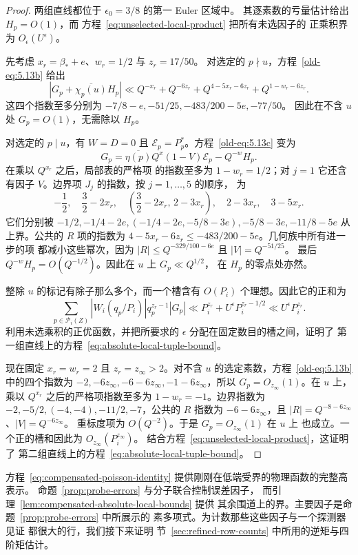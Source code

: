 \begin{proof}
两组直线都位于 $\epsilon_0=3/8$ 的第一 Euler 区域中。
其逐素数的亏量估计给出 $H_p=O(1)$，而
方程~\eqref{eq:unselected-local-product} 把所有未选因子的
正乘积界为 $O_\epsilon(U^\epsilon)$。

先考虑 $x_r=\beta_*+e$、$w_r=1/2$ 与 $z_r=17/50$。
对选定的 $p\nmid u$，方程~\eqref{old-eq:5.13b} 给出
\[
 |G_p+\overline{\chi_p(u)}H_p|
 \ll Q^{-x_r}+Q^{-6z_r}
       +Q^{4-5x_r-6z_r}+Q^{1-w_r-6z_r}.
\]
这四个指数至多分别为
$-7/8-e,-51/25,-483/200-5e,-77/50$。
因此在不含 $u$ 处 $G_p=O(1)$，无需除以 $H_p$。

对选定的 $p\mid u$，有 $W=D=0$ 且
$\mathcal E_p=P_p^*$。方程~\eqref{old-eq:5.13c} 变为
\[
 G_p=\overline{\eta(p)}Q^x(1-V)\mathcal E_p-Q^{-w}H_p.
\]
在乘以 $Q^{x_r}$ 之后，局部表的严格项
的指数至多为 $1-w_r=1/2$；对 $j=1$ 它还含有因子
$V$。边界项 $J_j$ 的指数，按 $j=1,\ldots,5$ 的顺序，
为
\[
 -\frac12,\quad \frac32-2x_r,\quad
 \left(\frac32-2x_r,\,2-3x_r\right),\quad
 2-3x_r,\quad 3-5x_r.
\]
它们分别被
$-1/2,-1/4-2e,(-1/4-2e,-5/8-3e),-5/8-3e,-11/8-5e$
从上界。公共的 $R$ 项的指数为
$4-5x_r-6z_r\le-483/200-5e$。几何族中所有进一步的项
都减小这些幂次，因为
$|R|\le Q^{-329/100-6e}$ 且 $|V|=Q^{-51/25}$。
最后 $Q^{-w}H_p=O(Q^{-1/2})$。因此在 $u$ 上 $G_p\ll Q^{1/2}$，
在 $H_p$ 的零点处亦然。

整除 $u$ 的标记有除子那么多个，而一个槽含有 $O(P_i)$
个理想。因此它的正和为
\begin{equation}\label{eq:small-line-positive-slot}
 \sum_{p\in\mathcal P_i(Z)}
       |W_i(q_p/P_i)|q_p^{z_r-1}|G_p|
 \ll P_i^{z_r}+U^\epsilon P_i^{z_r-1/2}
 \ll U^\epsilon P_i^{z_r}.
\end{equation}
利用未选乘积的正优函数，并把所要求的 $\epsilon$
分配在固定数目的槽之间，证明了
第一组直线上的方程~\eqref{eq:absolute-local-tuple-bound}。

现在固定 $x_r=w_r=2$ 且 $z_r=z_\infty>2$。对不含
$u$ 的选定素数，方程~\eqref{old-eq:5.13b} 中的四个指数为
$-2,-6z_\infty,-6-6z_\infty,-1-6z_\infty$，所以
$G_p=O_{z_\infty}(1)$。在 $u$ 上，乘以
$Q^{x_r}$ 之后的严格项指数至多为 $1-w_r=-1$。边界指数为
$-2,-5/2,(-4,-4),-11/2,-7$，公共的 $R$ 指数为
$-6-6z_\infty$，且 $|R|=Q^{-8-6z_\infty}$、$|V|=Q^{-6z_\infty}$。
重标度项为 $O(Q^{-2})$。于是 $G_p=O_{z_\infty}(1)$ 在 $u$ 上
也成立。一个正的槽和因此为 $O_{z_\infty}(P_i^{z_\infty})$。
结合方程~\eqref{eq:unselected-local-product}，这证明了
第二组直线上的方程~\eqref{eq:absolute-local-tuple-bound}。
\end{proof}


方程~\eqref{eq:compensated-poisson-identity} 提供刚刚在低端受界的物理函数的完整高
表示。
命题~\ref{prop:probe-errors} 与分子联合控制误差因子，
而引理~\ref{lem:compensated-absolute-local-bounds} 提供
其余围道上的界。主要因子是命题~\ref{prop:probe-errors} 中所展示的
素多项式。为计数那些这些因子与一个探测器见证
都很大的行，我们接下来证明
节~\ref{sec:refined-row-counts} 中所用的逆矩与四阶矩估计。

